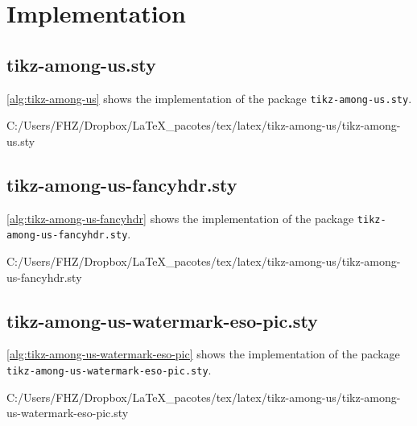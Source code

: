 \documentclass[12pt]{article}
\begin{document}
\section{Implementation}

\subsection{tikz-among-us.sty}

\autoref{alg:tikz-among-us} shows the implementation of the package \texttt{tikz-among-us.sty}.


{C:/Users/FHZ/Dropbox/LaTeX_pacotes/tex/latex/tikz-among-us/tikz-among-us.sty}

\subsection{tikz-among-us-fancyhdr.sty}

\autoref{alg:tikz-among-us-fancyhdr} shows the implementation of the package \texttt{tikz-among-us-fancyhdr.sty}.


{C:/Users/FHZ/Dropbox/LaTeX_pacotes/tex/latex/tikz-among-us/tikz-among-us-fancyhdr.sty}

\subsection{tikz-among-us-watermark-eso-pic.sty}

\autoref{alg:tikz-among-us-watermark-eso-pic} shows the implementation of the package \texttt{tikz-among-us-watermark-eso-pic.sty}.


{C:/Users/FHZ/Dropbox/LaTeX_pacotes/tex/latex/tikz-among-us/tikz-among-us-watermark-eso-pic.sty}
\end{document}
